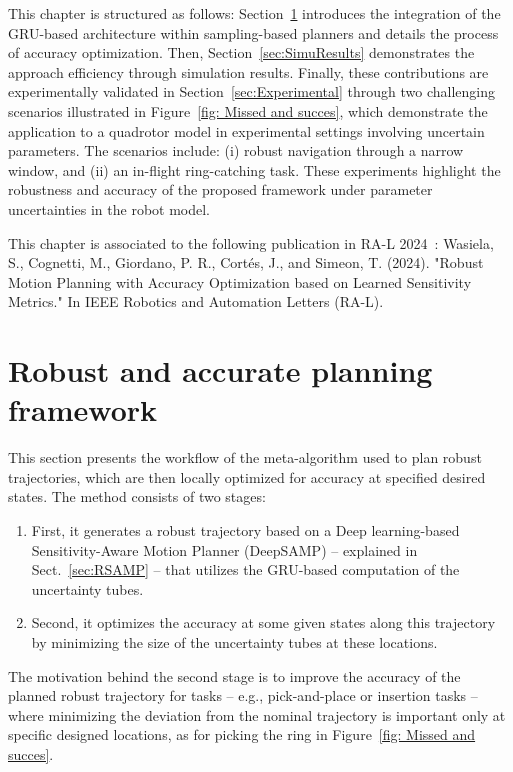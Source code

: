 This chapter is structured as follows: Section~\ref{sec:RASAMP} introduces the integration of the GRU-based architecture within sampling-based planners and details the process of accuracy optimization.
Then, Section~\ref{sec:SimuResults} demonstrates the approach efficiency through simulation results.
Finally, these contributions are experimentally validated in Section~\ref{sec:Experimental} through two challenging scenarios illustrated in Figure~\ref{fig: Missed and succes}, which demonstrate the application to a quadrotor model in experimental settings involving uncertain parameters. 
The scenarios include: (i) robust navigation through a narrow window, and (ii) an in-flight ring-catching task. 
These experiments highlight the robustness and accuracy of the proposed framework under parameter uncertainties in the robot model.

This chapter is associated to the following publication in RA-L 2024~\cite{cRAL}: Wasiela, S., Cognetti, M., Giordano, P. R., Cortés, J., and Simeon, T. (2024). "Robust Motion Planning with Accuracy Optimization based on Learned Sensitivity Metrics." In IEEE Robotics and Automation Letters (RA-L).

\section{Robust and accurate planning framework}\label{sec:RASAMP}

This section presents the workflow of the meta-algorithm used to plan robust trajectories, which are then locally optimized for accuracy at specified desired states. 
The method consists of two stages: 
\begin{enumerate}
    \item First, it generates a robust trajectory based on a Deep learning-based Sensitivity-Aware Motion Planner (DeepSAMP) -- explained in Sect.~\ref{sec:RSAMP} -- that utilizes the GRU-based computation of the uncertainty tubes.
    \item Second, it optimizes the accuracy at some given states along this trajectory by minimizing the size of the uncertainty tubes at these locations.
\end{enumerate}

The motivation behind the second stage is to improve the accuracy of the planned robust trajectory for tasks -- e.g., pick-and-place or insertion tasks -- where minimizing the deviation from the nominal trajectory is important only at specific designed locations, as for picking the ring in Figure~\ref{fig: Missed and succes}.

